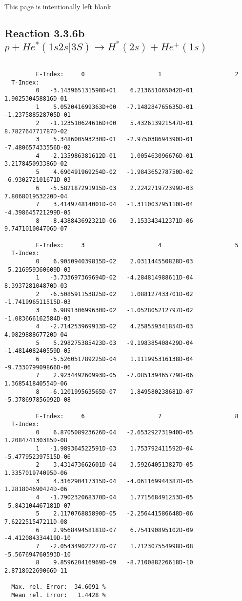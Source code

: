 \documentclass[12pt]{article}
\begin{document}
\newpage
This page is intentionally left blank
\newpage

\subsection{
Reaction 3.3.6b   $p + He^*(1s2s|3S) \rightarrow H^*(2s) + He^+(1s) $
}

\begin{small}\begin{verbatim}

         E-Index:     0                     1                     2
  T-Index:
         0   -3.143965131590D+01    6.213651065042D-01    1.902530458816D-01
         1    5.052041699363D+00   -7.148284765635D-01   -1.237588528705D-01
         2   -1.123510624616D+00    5.432613921547D-01    8.782764771787D-02
         3    5.348600593230D-01   -2.975038694390D-01   -7.480657433556D-02
         4   -2.135986381612D-01    1.005463096676D-01    3.217845093386D-02
         5    4.690491969254D-02   -1.984365278750D-02   -6.930272101671D-03
         6   -5.582187291915D-03    2.224271972399D-03    7.806801953220D-04
         7    3.414974814001D-04   -1.311003795110D-04   -4.398645721299D-05
         8   -8.438843692321D-06    3.153343412371D-06    9.747101004706D-07

         E-Index:     3                     4                     5
  T-Index:
         0    6.905094039815D-02    2.031144550828D-03   -5.216959360609D-03
         1   -3.733697369694D-02   -4.284814988611D-04    8.393728104870D-03
         2   -6.508591153825D-02    1.088127433701D-02   -1.741996511515D-03
         3    6.989130699630D-02   -1.052805212797D-02   -1.083666162584D-03
         4   -2.714253969913D-02    4.258559341854D-03    4.082988867720D-04
         5    5.298275385423D-03   -9.198385408429D-04   -1.481408240559D-05
         6   -5.526051789225D-04    1.111995316138D-04   -9.733079909866D-06
         7    2.923449260993D-05   -7.085139465779D-06    1.368541840554D-06
         8   -6.120199563565D-07    1.849580238681D-07   -5.378697856092D-08

         E-Index:     6                     7                     8
  T-Index:
         0    6.870508923626D-04   -2.653292731940D-05    1.208474130385D-08
         1   -1.989364522591D-03    1.753792411592D-04   -5.477952397515D-06
         2    3.431473662601D-04   -3.592640513827D-05    1.335701974095D-06
         3    4.316290417315D-04   -4.061169944387D-05    1.281804690424D-06
         4   -1.790232068370D-04    1.771568491253D-05   -5.843104467181D-07
         5    2.117076885890D-05   -2.256441586648D-06    7.622251547211D-08
         6    2.956849458181D-07    6.754190895102D-09   -4.412084334419D-10
         7   -2.054349022277D-07    1.712307554998D-08   -5.567694760593D-10
         8    9.859620416969D-09   -8.710088226618D-10    2.871802269066D-11

  Max. rel. Error:  34.6091 %
  Mean rel. Error:   1.4428 %
\end{verbatim}\end{small}
\end{document}
